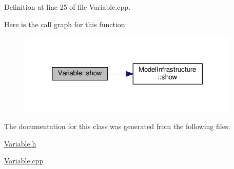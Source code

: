 Definition at line 25 of file Variable.\-cpp.



Here is the call graph for this function\-:\nopagebreak
\begin{figure}[H]
\begin{center}
\leavevmode
\includegraphics[width=300pt]{class_variable_a8bd0a772bb32fd630e252306306cd154_cgraph}
\end{center}
\end{figure}




The documentation for this class was generated from the following files\-:\begin{DoxyCompactItemize}
\item 
\hyperlink{_variable_8h}{Variable.\-h}\item 
\hyperlink{_variable_8cpp}{Variable.\-cpp}\end{DoxyCompactItemize}
